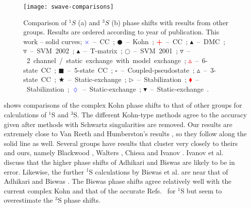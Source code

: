 \documentclass[Dissertation.tex]{subfiles}
\begin{document}
\begin{figure}
	\centering
	\texttt{[image: swave-comparisons]}
	\caption[Comparison of $^1S$ and $^3S$ phase shifts]{Comparison of $^1S$ (a) and $^3S$ (b) phase shifts
with results from other groups. Results are ordered according to year of
publication. This work -- solid curves;
\mbox{\textcolor{blue}{$\times$} -- CC \cite{Walters2004};}
\mbox{$\CIRCLE$ -- Kohn \cite{VanReeth2003};}
\mbox{\textcolor{red}{\textbf{+}} -- CC \cite{Blackwood2002};}
\mbox{$\blacktriangle$ -- DMC \cite{Chiesa2002};} 
\mbox{$\triangledown$ -- SVM 2002 \cite{Ivanov2002};} 
\mbox{\textcolor[RGB]{0,127,0}{$\blacktriangle$} -- T-matrix \cite{Biswas2002a};} 
\mbox{$\Circle$ -- SVM 2001 \cite{Ivanov2001};} 
\mbox{\textcolor[RGB]{0,127,0}{$\triangledown$} -- 2 channel / static exchange with model exchange \cite{Biswas2001};} 
\mbox{\textcolor{red}{$\vartriangle$} -- 6-state CC \cite{Sinha2000};} 
\mbox{$\blacksquare$ -- 5-state CC \cite{Adhikari1999};} 
\mbox{$\square$ -- Coupled-pseudostate \cite{Campbell1998};} 
\mbox{$\vartriangle$ -- 3-state CC \cite{Sinha1997};} 
\mbox{\textcolor[RGB]{0,127,0}{$\bigstar$} -- Static-exchange \cite{Ray1997};} 
\mbox{$\triangleright$ -- Stabilization \cite{Drachman1976};} 
\mbox{\textcolor{red}{$\blacklozenge$} -- Stabilization \cite{Drachman1975};}
\mbox{\textcolor{blue}{$\lozenge$} -- Static-exchange \cite{Hara1975};}
\mbox{$\blacktriangledown$ -- Static-exchange \cite{Fraser1961}.}}
	\label{fig:SWaveComparisons}
\end{figure}


 shows comparisons of the complex Kohn phase 
shifts to that of other groups for calculations of $^1$S and $^3$S. The
different Kohn-type methods agree to the accuracy given after methods with
Schwartz singularities are removed. Our results are extremely close to Van
Reeth and Humberston's results \cite{VanReeth2003}, so they 
follow along the solid line as well. Several groups have results that cluster 
very closely to theirs and ours, namely Blackwood \cite{Blackwood2002}, Walters 
\cite{Walters2004}, Chiesa \cite{Chiesa2002} and Ivanov \cite{Ivanov2002}. 
Ivanov et al.\ \cite{Ivanov2002} discuss that the higher phase shifts of
Adhikari and Biswas \cite{Adhikari1999} are likely to be in error. Likewise, 
the further $^1$S calculations by Biswas et al. \cite{Biswas2002a} are near 
that of Adhikari and Biswas \cite{Adhikari1999}. The Biswas \cite{Biswas2001} phase shifts 
agree relatively well with the current complex Kohn and that of the accurate 
Refs.~\cite{Blackwood2002,VanReeth2003,Walters2004} for $^1$S but seem to 
overestimate the $^3$S phase shifts.
\end{document}
